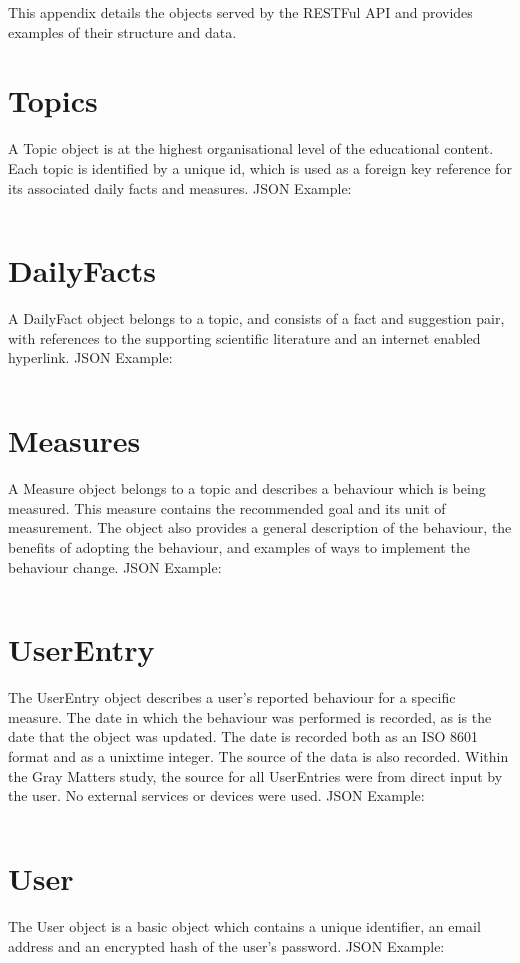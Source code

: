  \label{apndx: rest-objects}
This appendix details the objects served by the RESTFul API and provides examples of their structure and data.

\section{Topics}
A Topic object is at the highest organisational level of the educational content. Each topic is identified by a unique id, which is used as a foreign key reference for its associated daily facts and measures. JSON Example: \inputminted{json}{Files/prevention-study-1/code/topicexample.json}

\section{DailyFacts}
A DailyFact object belongs to a topic, and consists of a fact and suggestion pair, with references to the supporting scientific literature and an internet enabled hyperlink. JSON Example: \inputminted{json}{Files/prevention-study-1/code/dailyfact.json}

\section{Measures}
A Measure object belongs to a topic and describes a behaviour which is being measured. This measure contains the recommended goal and its unit of measurement. The object also provides a general description of the behaviour, the benefits of adopting the behaviour, and examples of ways to implement the behaviour change. JSON Example: \inputminted{json}{Files/prevention-study-1/code/measures.json}

\section{UserEntry}
The UserEntry object describes a user's reported behaviour for a specific measure. The date in which the behaviour was performed is recorded, as is the date that the object was updated. The date is recorded both as an ISO 8601 format and as a unixtime integer. The source of the data is also recorded. Within the Gray Matters study, the source for all UserEntries were from direct input by the user. No external services or devices were used. JSON Example: \inputminted{json}{Files/prevention-study-1/code/userentry.json}

\section{User}
The User object is a basic object which contains a unique identifier, an email address and an encrypted hash of the user's password. JSON Example:
\inputminted{json}{Files/prevention-study-1/code/user.json}

